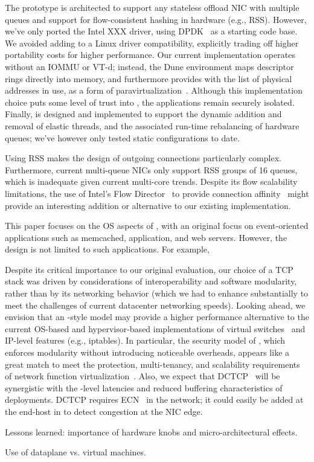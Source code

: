  


 The \ix prototype is
architected to support any stateless offload NIC with multiple queues
and support for flow-consistent hashing in hardware (e.g., RSS).
However, we've only ported the Intel XXX driver, using
DPDK~\cite{intel:dpdk} as a starting code base.  We avoided adding to
\ix a Linux driver compatibility, explicitly trading off higher
portability costs for higher performance.  Our current implementation
operates without an IOMMU or VT-d; instead, the Dune environment maps
descriptor rings directly into \ix memory, and furthermore provides
\ix with the list of physical addresses in use, as a form of
paravirtualization~\cite{DBLP:conf/sosp/BarhamDFHHHN03}.  Although
this implementation choice puts some level of trust into \ix, the
applications remain securely isolated.  Finally, \ix is designed and
implemented to support the dynamic addition and removal of elastic
threads, and the associated run-time rebalancing of hardware queues;
we've however only tested static configurations to date. 

 Using RSS
makes the design of outgoing connections particularly complex.
Furthermore, current multi-queue NICs only support RSS groups of 16
queues, which is inadequate given current multi-core trends.  Despite
its flow scalability limitations, the use of Intel's Flow
Director~\cite{intel:82599} to provide connection
affinity~\cite{DBLP:conf/eurosys/PesterevSZM12} might provide an
interesting addition or alternative to our existing implementation.


 This paper focuses on the
OS aspects of \ix, with an original focus on event-oriented
applications such as memcached, application, and web servers.
However, the \ix design is not limited to such applications.  For
example, 

Despite its critical importance to our original evaluation, our choice
of a TCP stack was driven by considerations of interoperability and
software modularity, rather than by its networking behavior (which we
had to enhance substantially to meet the challenges of current
datacenter networking speeds).  Looking ahead, we envision that an
\ix-style model may provide a higher performance alternative to the
current OS-based and hypervisor-based implementations of virtual
switches~\cite{openvswitch} and IP-level features (e.g., iptables).
In particular, the security model of \ix, which enforces modularity
without introducing noticeable overheads, appears like a great match
to meet the protection, multi-tenancy, and scalability requirements of
network function virtualization~\cite{etsi:NFV}.  Also, we expect that
DCTCP~\cite{DBLP:conf/sigcomm/AlizadehGMPPPSS10} will be synergistic
with the \microsecond-level latencies and reduced buffering
characteristics of \ix deployments.  DCTCP requires
ECN~\cite{ramakrishnan2001addition} in the network; it could easily be
added at the end-host in \ix to detect congestion at the NIC edge.




\todo Lessons learned: importance of hardware knobs and micro-architectural effects.


\todo Use of dataplane vs. virtual machines. 

